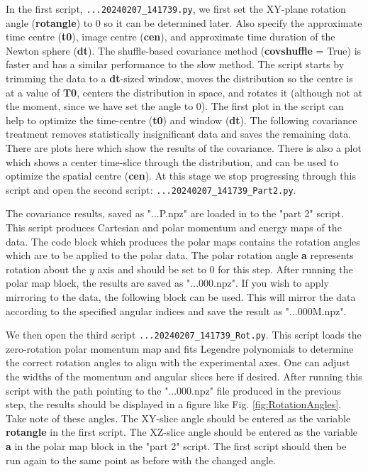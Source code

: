 \documentclass[12pt]{article}
\begin{document}
In the first script, \texttt{...20240207\_141739.py}, we first set the XY-plane rotation angle (\textbf{rotangle}) to 0 so it can be determined later.
Also specify the approximate time centre (\textbf{t0}), image centre (\textbf{cen}), and approximate time duration of the Newton sphere (\textbf{dt}).
The shuffle-based covariance method (\textbf{covshuffle} = True) is faster and has a similar performance to the slow method.
The script starts by trimming the data to a \textbf{dt}-sized window, moves the distribution so the centre is at a value of \textbf{T0}, centers the distribution in space, and rotates it (although not at the moment, since we have set the angle to 0).
The first plot in the script can help to optimize the time-centre (\textbf{t0}) and window (\textbf{dt}).
The following covariance treatment removes statistically insignificant data and saves the remaining data.
There are plots here which show the results of the covariance.
There is also a plot which shows a center time-slice through the distribution, and can be used to optimize the spatial centre (\textbf{cen}).
At this stage we stop progressing through this script and open the second script: \texttt{...20240207\_141739\_Part2.py}.

The covariance results, saved as "...P.npz" are loaded in to the "part 2" script.
This script produces Cartesian and polar momentum and energy maps of the data.
The code block which produces the polar maps contains the rotation angles which are to be applied to the polar data.
The polar rotation angle \textbf{a} represents rotation about the $y$ axis and should be set to 0 for this step.
After running the polar map block, the results are saved as "...000.npz".
If you wish to apply mirroring to the data, the following block can be used.
This will mirror the data according to the specified angular indices and save the result as "...000M.npz".

We then open the third script \texttt{...20240207\_141739\_Rot.py}.
This script loads the zero-rotation polar momentum map and fits Legendre polynomials to determine the correct rotation angles to align with the experimental axes.
One can adjust the widths of the momentum and angular slices here if desired.
After running this script with the path pointing to the "...000.npz" file produced in the previous step, the results should be displayed in a figure like Fig. \ref{fig:RotationAngles}.
Take note of these angles.
The XY-slice angle should be entered as the variable \textbf{rotangle} in the first script.
The XZ-slice angle should be entered as the variable \textbf{a} in the polar map block in the "part 2" script.
The first script should then be run again to the same point as before with the changed angle.
\end{document}
